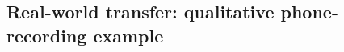 \documentclass{article}
\newcommand{\kyung}[1]{\textcolor{magenta}{K: #1}}
\begin{document}
\subsection{Real-world transfer: qualitative phone-recording example}
\label{sec:real}






\end{document}
